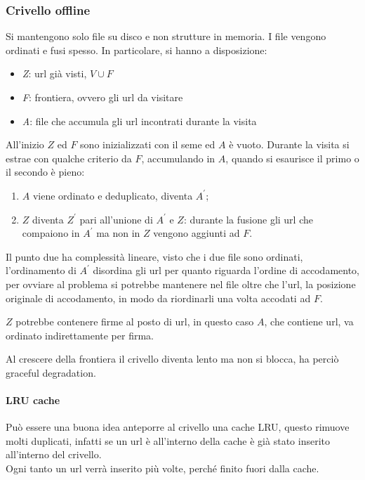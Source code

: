 \subsubsection{Crivello offline} 
Si mantengono solo file su disco e non strutture in memoria. 
I file vengono ordinati e fusi spesso. In particolare, si hanno a disposizione: 
\begin{itemize}
    \item \emph{Z}: url già visti, $V \cup F$
    \item \emph{F}: frontiera, ovvero gli url da visitare
    \item \emph{A}: file che accumula gli url incontrati durante la visita
\end{itemize}

All'inizio $Z$ ed $F$ sono inizializzati con il seme ed $A$ è vuoto.
Durante la visita si estrae con qualche criterio da $F$, accumulando in $A$, 
quando si esaurisce il primo o il secondo è pieno:
\begin{enumerate}
    \item $A$ viene ordinato e deduplicato, diventa $A^\prime$;
    \item $Z$ diventa $Z^\prime$ pari all'unione di  $A^\prime$ e $Z$: 
    durante la fusione gli url che compaiono in $A^\prime$ ma non in $Z$ vengono 
    aggiunti ad $F$.
\end{enumerate}

Il punto due ha complessità lineare, visto che i due file sono ordinati, 
l'ordinamento di $A^\prime$ disordina gli url per quanto riguarda l'ordine di accodamento, 
per ovviare al problema si potrebbe mantenere nel file oltre che l'url, la posizione originale
di accodamento, in modo da riordinarli una volta accodati ad $F$.

$Z$ potrebbe contenere firme al posto di url, in questo caso $A$, che contiene url, 
va ordinato indirettamente per firma.

Al crescere della frontiera il crivello diventa lento ma non si blocca, ha perciò graceful 
degradation.

\paragraph{LRU cache}
Può essere una buona idea anteporre al crivello una cache LRU, questo rimuove 
molti duplicati, infatti se un url è all'interno della cache è già stato inserito 
all'interno del crivello. \\
Ogni tanto un url verrà inserito più volte, perché finito fuori dalla cache.

